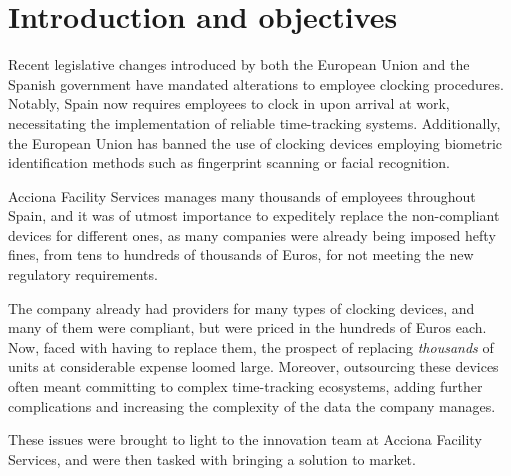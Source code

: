 \chapter{Introduction and objectives}
\label{cap:introduction}


Recent legislative changes introduced by both the European Union and the Spanish government have mandated 
alterations to employee clocking procedures. Notably, Spain now requires employees to clock in upon arrival 
at work, necessitating the implementation of reliable time-tracking systems. Additionally, the European Union 
has banned the use of clocking devices employing biometric identification methods such as fingerprint 
scanning or facial recognition.

Acciona Facility Services manages many thousands of employees throughout Spain, and it was of utmost importance
to expeditely replace the non-compliant devices for different ones, as many companies were already being
imposed hefty fines, from tens to hundreds of thousands of Euros, for not meeting the new regulatory 
requirements.

The company already had providers for many types of clocking devices, and many of them were compliant, but 
were priced in the hundreds of Euros each. Now, faced with having to replace them, the prospect of replacing 
\textit{thousands} of units at considerable expense loomed large.  Moreover, outsourcing these devices often 
meant committing to complex time-tracking ecosystems, adding further complications and increasing the
complexity of the data the company manages.

These issues were brought to light to the innovation team at Acciona Facility Services, and were then tasked
with bringing a solution to market.



